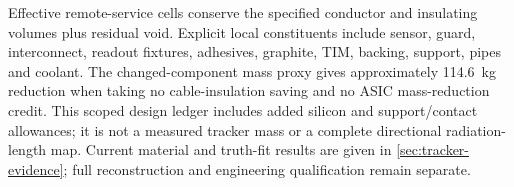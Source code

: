 Effective remote-service cells conserve the specified conductor and insulating
volumes plus residual void. Explicit local constituents include sensor, guard,
interconnect, readout fixtures, adhesives, graphite, TIM, backing, support,
pipes and coolant. The changed-component mass proxy gives approximately
\qty{114.6}{\kilogram} reduction when taking no cable-insulation saving and no
ASIC mass-reduction credit. This scoped design ledger includes added silicon
and support/contact allowances; it is not a measured tracker mass or a complete
directional radiation-length map. Current material and truth-fit results are
given in \cref{sec:tracker-evidence}; full reconstruction and engineering
qualification remain separate.
